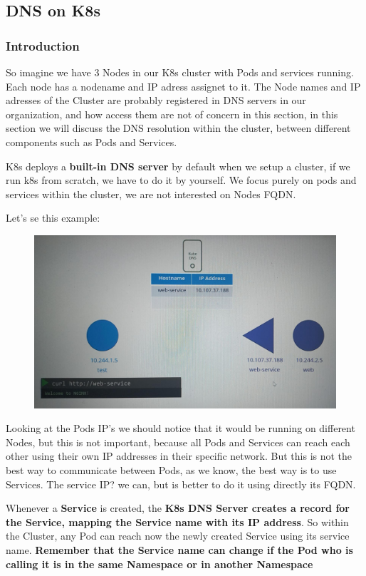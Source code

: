 \documentclass{article}
\begin{document}
\subsection{DNS on K8s}
\subsubsection{Introduction}
So imagine we have 3 Nodes in our K8s cluster with Pods and services running. 
Each node has a nodename and IP adress assignet to it. 
The Node names and IP adresses  of the Cluster are probably registered in
DNS servers in our organization, and how access them are not of concern in this section, in this section we will discuss the DNS resolution within the cluster, between different components such as Pods and Services.

K8s deploys a \textbf{built-in DNS server} by default when we setup a cluster, if we run k8s from scratch, we have to do it by yourself. We focus purely on pods and services within the cluster, we are not interested on Nodes FQDN. 

Let's se this example:

\begin{figure}[H]
    \centering
    \includegraphics[width=\textwidth]{pictures/ingress1.png}
\end{figure}

Looking at the Pods IP's we should notice that it would be running on different Nodes,
but this is not important, because all Pods and Services can reach each other using 
their own IP addresses in their specific network. 
But this is not the best way to communicate between Pods, as we know, the best way is to use Services. The service IP? we can, but is better to do it using directly its FQDN.

Whenever a \textbf{Service} is created, the \textbf{K8s DNS Server creates a record for the Service, mapping the Service name with its IP address}. So within the Cluster, any Pod can reach now the newly created Service using its service name. \textbf{Remember that the Service name can change if the Pod who is calling it is in the same Namespace or in another Namespace}
\end{document}
